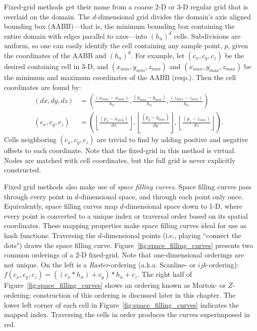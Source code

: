 \documentclass{report}
\begin{document}
Fixed-grid methods get their name from a coarse 2-D or 3-D regular grid that is overlaid on the domain. The $d$-dimensional grid divides the domain's axis aligned bounding box (AABB)---that is, the minimum bounding box containing the entire domain with edges parallel to axes---into $(h_n)^d$ cells. Subdivisions are uniform, so one can easily identify the cell containing any sample point, $p$, given the coordinates of the AABB and $(h_n)^d$. For example, let $(c_x, c_y, c_z)$ be the desired containing cell in 3-D, and $(x_{min}, y_{min}, z_{min})$ and $(x_{max}, y_{max}, z_{max})$ be the minimum and maximum coordinates of the AABB (resp.). Then the cell coordinates are found by:  
\begin{align}
(dx, dy, dz) & = \left(\frac{(x_{max} - x_{min})}{h_n}, \frac{(y_{max} - y_{min})}{h_n}, \frac{(z_{max} - z_{min})}{h_n}\right) \nonumber \\
(c_x, c_y, c_z) & = \left(\left\lfloor\frac{(p_x - x_{min})}{dx}\right\rfloor , \left\lfloor\frac{(p_y - y_{min})}{dy}\right\rfloor , \left\lfloor\frac{(p_z - z_{min})}{dz}\right\rfloor \right).
\label{eq:cell_hash}
\end{align}
Cells neighboring $(c_x, c_y, c_z)$ are trivial to find by adding positive and negative offsets to each coordinate. Note that the fixed-grid in this method is virtual. Nodes are matched with cell coordinates, but the full grid is never explicitly constructed.

Fixed grid methods also make use of \emph{space filling curves}. Space filling curves pass through every point in $d$-dimensional space, and through each point only once. Equivalently, space filling curves map $d$-dimensional space down to 1-D, where every point is converted to a unique index or traversal order based on its spatial coordinates. These mapping properties make space filling curves ideal for use as hash functions. Traversing the $d$-dimensional points (i.e., playing ``connect the dots") draws the space filling curve. Figure~\ref{fig:space_filling_curves} presents two common orderings of a 2-D fixed-grid. Note that one-dimensional orderings are not unique. On the left is a \emph{Raster}-ordering (a.k.a. Scanline- or $ijk$-ordering): $f(c_x,c_y,c_z) = ((c_x * h_n) + c_y) * h_n + c_z$. The right half of Figure~\ref{fig:space_filling_curves} shows an ordering known as Morton- or $Z$-ordering; construction of this ordering is discussed later in this chapter. The lower left corner of each cell in Figure~\ref{fig:space_filling_curves} indicates the mapped index. Traversing the cells in order produces the curves superimposed in red. 
\end{document}
